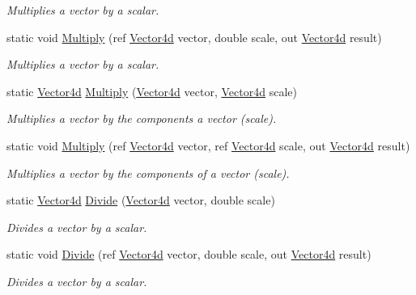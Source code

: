 \begin{DoxyCompactItemize}
\begin{DoxyCompactList}\small\item\em Multiplies a vector by a scalar. \end{DoxyCompactList}\item 
static void \hyperlink{struct_open_t_k_1_1_vector4d_a01b6b4cffd8422610f3da5598874b82c}{Multiply} (ref \hyperlink{struct_open_t_k_1_1_vector4d}{Vector4d} vector, double scale, out \hyperlink{struct_open_t_k_1_1_vector4d}{Vector4d} result)
\begin{DoxyCompactList}\small\item\em Multiplies a vector by a scalar. \end{DoxyCompactList}\item 
static \hyperlink{struct_open_t_k_1_1_vector4d}{Vector4d} \hyperlink{struct_open_t_k_1_1_vector4d_a7605e9a585b8091c01a158be113ac2e4}{Multiply} (\hyperlink{struct_open_t_k_1_1_vector4d}{Vector4d} vector, \hyperlink{struct_open_t_k_1_1_vector4d}{Vector4d} scale)
\begin{DoxyCompactList}\small\item\em Multiplies a vector by the components a vector (scale). \end{DoxyCompactList}\item 
static void \hyperlink{struct_open_t_k_1_1_vector4d_a95d2aa0b0eeb3ed3c5880635af409e8b}{Multiply} (ref \hyperlink{struct_open_t_k_1_1_vector4d}{Vector4d} vector, ref \hyperlink{struct_open_t_k_1_1_vector4d}{Vector4d} scale, out \hyperlink{struct_open_t_k_1_1_vector4d}{Vector4d} result)
\begin{DoxyCompactList}\small\item\em Multiplies a vector by the components of a vector (scale). \end{DoxyCompactList}\item 
static \hyperlink{struct_open_t_k_1_1_vector4d}{Vector4d} \hyperlink{struct_open_t_k_1_1_vector4d_a3821ff51eb8cc9d99d44119a4d6c6961}{Divide} (\hyperlink{struct_open_t_k_1_1_vector4d}{Vector4d} vector, double scale)
\begin{DoxyCompactList}\small\item\em Divides a vector by a scalar. \end{DoxyCompactList}\item 
static void \hyperlink{struct_open_t_k_1_1_vector4d_a7ef9359fbaa92b5655e8733dce328613}{Divide} (ref \hyperlink{struct_open_t_k_1_1_vector4d}{Vector4d} vector, double scale, out \hyperlink{struct_open_t_k_1_1_vector4d}{Vector4d} result)
\begin{DoxyCompactList}\small\item\em Divides a vector by a scalar. \end{DoxyCompactList}\item 

\end{DoxyCompactItemize}
